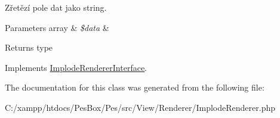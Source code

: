 Zřetězí pole dat jako string.


\begin{DoxyParams}[1]{Parameters}
array & {\em \$data} & \\
\hline
\end{DoxyParams}
\begin{DoxyReturn}{Returns}
type 
\end{DoxyReturn}


Implements \mbox{\hyperlink{interface_pes_1_1_view_1_1_renderer_1_1_implode_renderer_interface}{Implode\+Renderer\+Interface}}.



The documentation for this class was generated from the following file\+:\begin{DoxyCompactItemize}
\item 
C\+:/xampp/htdocs/\+Pes\+Box/\+Pes/src/\+View/\+Renderer/Implode\+Renderer.\+php\end{DoxyCompactItemize}

